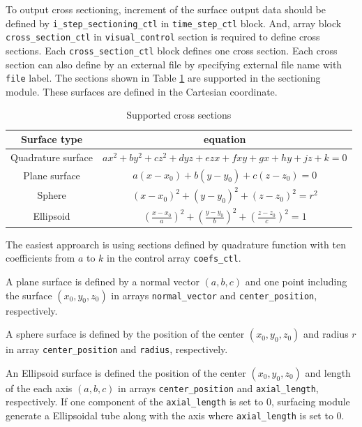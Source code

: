To output cross sectioning, increment of the surface output data should be defined by \verb|i_step_sectioning_ctl| in \verb|time_step_ctl| block. And, array block \\ \verb|cross_section_ctl| in \verb|visual_control| section is required to define cross sections. Each \verb|cross_section_ctl| block defines one cross section. Each cross section can also define by an external file by specifying external file name with \verb|file| label.
%
The sections shown in Table \ref{table:section_list} are supported in the sectioning module. These surfaces are defined in the Cartesian coordinate.
\begin{table}[htp]
\caption{Supported cross sections}
\begin{center}
\begin{tabular}{|c|c|}
\hline
Surface type & equation \\ \hline
Quadrature surface 
 & $a x^2 + b y^2 + c z^2 + d y z + e z x + f x y + g x + h y + j z + k = 0$ \\
Plane surface 
& $a \left(x-x_{0} \right) + b \left(y-y_{0} \right) + c \left(z-z_{0} \right) = 0$ \\
 Sphere 
& $\left(x-x_{0} \right)^2 + \left(y-y_{0} \right)^2 + \left(z-z_{0} \right)^2 = r^2$  \\
 Ellipsoid 
& $\displaystyle{ \left(\frac{x-x_{0}}{a} \right)^2 + \left( \frac{y-y_{0}}{b} \right)^2 + \left( \frac{z-z_{0}}{c} \right)^2} = 1$ \\
\hline
\end{tabular}
\end{center}
\label{table:section_list}
\end{table}
%
The easiest approarch is using sections defined by quadrature function with ten coefficients from $a$ to $k$ in the control array \verb|coefs_ctl|.

A plane surface is defined by a normal vector $(a, b, c)$ and one point including the surface $(x_{0}, y_{0}, z_{0})$ in arrays \verb|normal_vector| and \verb|center_position|, respectively.

A sphere surface is defined by the position of the center $(x_{0}, y_{0}, z_{0})$ and radius $r$ in array \verb|center_position| and \verb|radius|, respectively.

An Ellipsoid surface is defined the position of the center $(x_{0}, y_{0}, z_{0})$ and length of the each axis $(a, b, c)$ in arrays  \verb|center_position| and \verb|axial_length|, respectively. If one component of the \verb|axial_length| is set to 0, surfacing module generate a Ellipsoidal tube along with the axis where \verb|axial_length| is set to 0.

